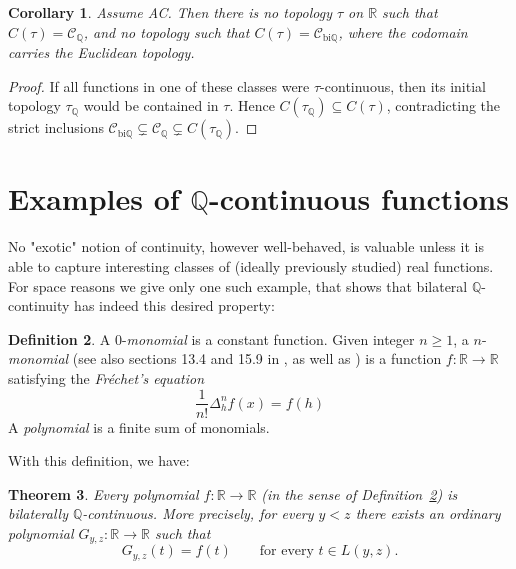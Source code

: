 \documentclass[11pt]{amsart} %
\newtheorem{theorem}{Theorem}[section]
\newtheorem{corollary}[theorem]{Corollary}
\theoremstyle{definition}
\newtheorem{definition}[theorem]{Definition}
\newcommand{\R}{\mathbb{R}}
\newcommand{\Q}{\mathbb{Q}}
\newcommand{\CQ}{\mathcal{C}_{\Q}}
\newcommand{\CbiQ}{\mathcal{C}_{\mathrm{bi}\Q}}
\begin{document}
\begin{corollary} Assume AC. Then there is no topology \(\tau\) on \(\R\) such that \(C(\tau)=\CQ\), and no topology such that \(C(\tau)=\CbiQ\), where the codomain carries the Euclidean topology. 
\end{corollary} 

\begin{proof} 
 If all functions in one of these classes were \(\tau\)-continuous, then its initial topology \(\tau_{\Q
}\) would be contained in \(\tau\). Hence \(C(\tau_{\Q})\subseteq C(\tau)\), contradicting the strict inclusions \(\CbiQ\subsetneq\CQ\subsetneq C(\tau_{\Q})\).

\end{proof} 





\section{Examples of $\Q$-continuous functions} 

No "exotic" notion of continuity, however well-behaved, is valuable unless it is able to capture interesting classes of (ideally previously studied) real functions. For space reasons we give only one such example, that shows that bilateral $\Q$-continuity has indeed this desired property: 

\begin{definition} A $0$-\emph{monomial} is a constant function. Given integer $n\geq 1$, a $n$-\emph{monomial} \cite{1} (see also sections 13.4 and 15.9 in \cite{12}, as well as \cite{47}) is a function $f:\R\rightarrow \R$ satisfying the \emph{Fréchet’s equation}
\begin{equation} 
\frac{1}{n!}\Delta_{h}^{n} f(x)=f(h)
\end{equation} 
A \emph{polynomial} is a finite sum of monomials.
\label{def:poly}
\end{definition} 

With this definition, we have: 
\begin{theorem}\label{thm:polynomials-bilateral-Q}
Every polynomial $f\colon\mathbb R\to\mathbb R$ (in the sense of Definition~\ref{def:poly}) is bilaterally
$\mathbb Q$-continuous. More precisely, for every $y<z$ there exists
an ordinary polynomial $G_{y,z}\colon\mathbb R\to\mathbb R$ such that
\begin{equation} 
    G_{y,z}(t)=f(t)
    \qquad\text{for every }t\in L(y,z).
\end{equation} 
\end{theorem}
\end{document}
